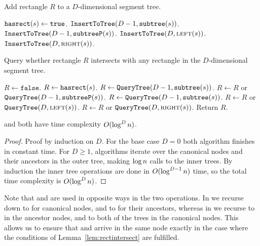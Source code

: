 \documentclass[english,gradu]{tktltiki2018}
\begin{document}
\begin{alg}\label{alg:rectadd}
Add rectangle $R$ to a $D$-dimensional segment tree.
\begin{algorithmic}
		\State $\texttt{hasrect}(s)\gets\texttt{true}$.
		\State $\texttt{InsertToTree}(D-1,\texttt{subtree}(s))$.
		\State $\texttt{InsertToTree}(D-1,\texttt{subtreeP}(s))$.
		\State $\texttt{InsertToTree}(D,\textsc{left}(s))$.
		\State $\texttt{InsertToTree}(D,\textsc{right}(s))$.
	\EndIf
\EndProcedure
\end{algorithmic}
\end{alg}

\begin{alg}\label{alg:rectcheck}
Query whether rectangle $R$ intersects with any rectangle in the $D$-dimensional segment tree.
\begin{algorithmic}
	\State $R\gets\texttt{false}$.
		\State $R\gets\texttt{hasrect}(s)$.
		\State $R\gets \texttt{QueryTree}(D-1,\texttt{subtree}(s))$.
		\State $R\gets R$ or $\texttt{QueryTree}(D-1,\texttt{subtreeP}(s))$.
		\State $R\gets \texttt{QueryTree}(D-1,\texttt{subtree}(s))$.
		\State $R\gets R$ or $\texttt{QueryTree}(D,\textsc{left}(s))$.
		\State $R\gets R$ or $\texttt{QueryTree}(D,\textsc{right}(s))$.
	\EndIf
	\State Return $R$.
\EndProcedure
\end{algorithmic}
\end{alg}

\begin{lem}\adddt and \checkdt both have time complexity $O(\log^Dn)$.\end{lem}
\begin{proof}
Proof by induction on $D$.
For the base case $D=0$ both algorithm finishes in constant time.
For $D\ge 1$, algorithms iterate over the canonical nodes and their ancestors in the outer tree, making $\log n$ calls to the inner trees.
By induction the inner tree operations are done in $O(\log^{D-1}n)$ time, so the total time complexity is $O(\log^Dn)$.
\end{proof}

Note that \subtree{} and \subtreep{} are used in opposite ways in the two operations.
In \adddt{} we recurse down to \subtree{} for canonical nodes, and to \subtreep{} for their ancestors, whereas in \checkdt{} we recurse to \subtree{} in the ancestor nodes, and to both of the trees in the canonical nodes.
This allows us to ensure that \adddt{} and \checkdt{} arrive in the same node exactly in the case where the conditions of Lemma~\ref{lem:rectintersect} are fulfilled.
\end{document}
